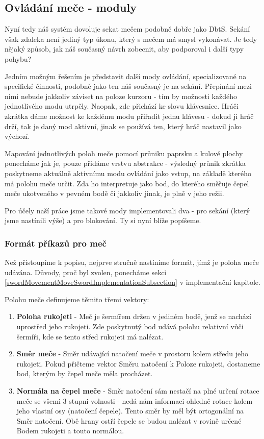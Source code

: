 \pagebreak

\subsection{Ovládání meče - moduly} \label{interfacesSwordMovementModulesSubsection}

Nyní tedy náš systém dovoluje sekat mečem podobně dobře jako \acl{DbtS}. Sekání však zdaleka není jediný typ úkonu, který s mečem má smysl vykonávat. Je tedy nějaký způsob, jak náš současný návrh zobecnit, aby podporoval i další typy pohybu?

Jedním možným řešením je představit další mody ovládání, specializované na specifické činnosti, podobně jako ten náš současný je na sekání. Přepínání mezi nimi nebude jakkoliv záviset na poloze kurzoru - tím by možnosti každého jednotlivého modu utrpěly. Naopak, zde přichází ke slovu klávesnice. Hráči zkrátka dáme možnost ke každému modu přiřadit jednu klávesu - dokud ji hráč drží, tak je daný mod aktivní, jinak se používá ten, který hráč nastavil jako výchozí.

Mapování jednotlivých poloh meče pomocí průniku paprsku a kulové plochy ponecháme jak je, pouze přidáme vrstvu abstrakce - výsledný průnik zkrátka poskytneme aktuálně aktivnímu modu ovládání jako vstup, na základě kterého má polohu meče určit. Zda ho interpretuje jako bod, do kterého směřuje čepel meče ukotveného v pevném bodě či jakkoliv jinak, je plně v jeho režii.

Pro účely naší práce jsme takové mody implementovali dva - pro sekání (který jsme nastínili výše) a pro blokování. Ty si nyní blíže popíšeme.

\subsubsection*{Formát příkazů pro meč}

Než přistoupíme k popisu, nejprve stručně nastíníme formát, jímž je poloha meče udávána. Důvody, proč byl zvolen, ponecháme sekci \ref{swordMovementMoveSwordImplementationSubsection} v implementační kapitole.

Polohu meče definujeme těmito třemi vektory:
\begin{enumerate}
    \item \textbf{Poloha rukojeti} - Meč je šermířem držen v jediném bodě, jenž se nachází uprostřed jeho rukojeti. Zde poskytnutý bod udává polohu relativní vůči šermíři, kde se tento střed rukojeti má nalézat.
    \item \textbf{Směr meče} - Směr udávající natočení meče v prostoru kolem středu jeho rukojeti. Pokud přičteme vektor Směru natočení k Poloze rukojeti, dostaneme bod, kterým by čepel meče měla procházet.
    \item \textbf{Normála na čepel meče} - Směr natočení sám nestačí na plné určení rotace meče se všemi 3 stupni volnosti - nedá nám informaci ohledně rotace kolem jeho vlastní osy (natočení čepele). Tento směr by měl být ortogonální na Směr natočení. Obě hrany ostří čepele se budou nalézat v rovině určené Bodem rukojeti a touto normálou.   
\end{enumerate}

